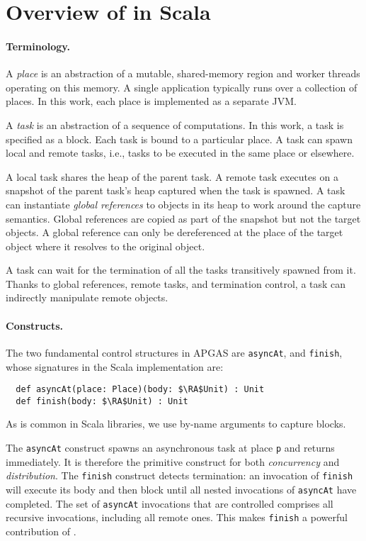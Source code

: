 \section{Overview of \apgas in Scala}
\label{sec:apgas}

\paragraph{Terminology.}
A {\em place} is an abstraction of a mutable, shared-memory region and worker threads operating on this memory.
A single application typically runs over a collection of places. In this work, each place is implemented as a separate JVM.

A {\em task} is an abstraction of a sequence of computations. In this work, a task is specified as a block.
Each task is bound to a particular place. 
A task can spawn local and remote tasks, i.e., tasks to be executed in the same place or elsewhere.

A local task shares the heap of the parent task. A remote task executes on a snapshot of the parent task's heap captured when the task is spawned. A task can instantiate \emph{global references} to objects in its heap to work around the capture semantics.
Global references are copied as part of the snapshot but not the target objects. A global reference can only be dereferenced
at the place of the target object where it resolves to the original object.

A task can wait for the termination of all the tasks transitively spawned from it.
Thanks to global references, remote tasks, and termination control,
a task can indirectly manipulate remote objects.

\paragraph{Constructs.}
The two fundamental control structures in APGAS are
 \lstinline{asyncAt}, and \lstinline{finish}, whose signatures in
the Scala implementation are:
\begin{lstlisting}
  def asyncAt(place: Place)(body: $\RA$Unit) : Unit
  def finish(body: $\RA$Unit) : Unit
\end{lstlisting}
As is common in Scala libraries, we use by-name arguments to capture blocks.

The \lstinline{asyncAt} construct spawns an asynchronous task at place \lstinline{p} and returns
immediately. It is therefore the primitive construct for both \emph{concurrency} and \emph{distribution}.
The \lstinline{finish} construct detects termination: an invocation of
\lstinline{finish} will execute its body and then block until all nested invocations
of \lstinline{asyncAt} have completed. The set of \lstinline{asyncAt} invocations
that are controlled comprises all recursive invocations, including all remote
ones. This makes \lstinline{finish} a powerful contribution of \apgas.


